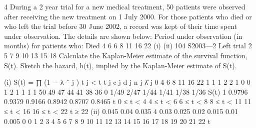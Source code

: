 \documentclass[a4paper,12pt]{article}
\begin{document}
4
During a 2 year trial for a new medical treatment, 50 patients were observed after
receiving the new treatment on 1 July 2000. For those patients who died or who left
the trial before 30 June 2002, a record was kept of their time spent under observation.
The details are shown below:
Period under observation (in months) for patients who:
Died
4
6
6
8
11
16
22
(i)
(ii)
104 S2003—2
Left trial
2
5
7
9
10
13
15
18
Calculate the Kaplan-Meier estimate of the survival function, S(t).
Sketch the hazard, h(t), implied by the Kaplan-Meier estimate of S(t).

(i)
S(t) =
∏ (1 − λ ˆ j )
t j < t
t j c j d j n j λ̂ j
0
4
6
8
11
16
22 1
1
1
2
2
1
0 0
1
2
1
1
1
1 50
49
47
44
41
38
36 0
1/49
2/47
1/44
1/41
1/38
1/36
S(t)
1
0.9796
0.9379
0.9166
0.8942
0.8707
0.8465
t
0 ≤ t < 4
4 ≤ t < 6
6 ≤ t < 8
8 ≤ t < 11
11 ≤ t < 16
16 ≤ t < 22
t ≥ 22
(ii)
0.045
0.04
0.035
4
0.03
0.025
0.02
0.015
0.01
0.005
0
0
1
2
3
4
5
6
7
8
9 10 11 12 13 14 15 16 17 18 19 20 21 22
t
\end{document}
